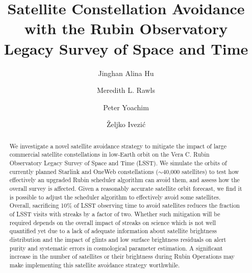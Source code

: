 \documentclass[twocolumn]{aastex631}
\begin{document}
\title{Satellite Constellation Avoidance with the Rubin Observatory Legacy Survey of Space and Time}

\author[0000-0002-8400-1910]{Jinghan Alina Hu}
\author[0000-0003-1305-7308]{Meredith L. Rawls}
\author[0000-0003-2874-6464]{Peter Yoachim}
\author[0000-0001-5250-2633]{\v{Z}eljko Ivezi\'{c}}


\begin{abstract}
We investigate a novel satellite avoidance strategy to mitigate the impact of large commercial satellite constellations in low-Earth orbit on the Vera C. Rubin Observatory Legacy Survey of Space and Time (LSST). We simulate the orbits of currently planned Starlink and OneWeb constellations ($\sim$40,000 satellites) to test how effectively an upgraded Rubin scheduler algorithm can avoid them, and assess how the overall survey is affected.
Given a reasonably accurate satellite orbit forecast, we find it is possible to adjust the scheduler algorithm to effectively avoid some satellites. Overall, sacrificing 10\% of LSST observing time to avoid satellites reduces the fraction of LSST visits with streaks by a factor of two. Whether such mitigation will be required depends on the overall impact of streaks on science which is not well quantified yet due to a lack of adequate information about satellite brightness distribution and the impact of glints and low surface brightness residuals on alert purity
and systematic errors in cosmological parameter estimation. A significant increase in the number of satellites or their brightness during Rubin Operations may make implementing this satellite avoidance strategy worthwhile.
\end{abstract}


\end{document}
